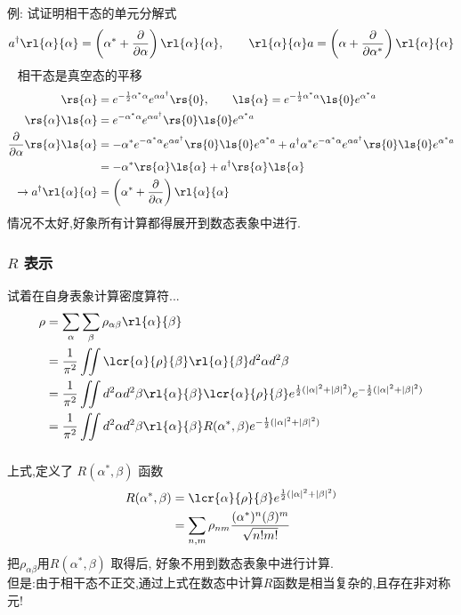 \begin{frame} 
\frametitle{}
  例: 试证明相干态的单元分解式
  \[ a^{\dagger} \rl{\alpha}{\alpha}= \left( \alpha^* + \frac{\partial }{\partial \alpha }\right) \rl{\alpha}{\alpha}, \qquad  \rl{\alpha}{\alpha} a = \left( \alpha + \frac{\partial }{\partial \alpha^* }\right) \rl{\alpha}{\alpha} \] 
  \证~ 相干态是真空态的平移
  \[ \begin{aligned}
    \rs{\alpha} &= e^{-\frac{1}{2} \alpha^* \alpha} e^{\alpha a^{\dagger}} \rs{0}, \qquad      \ls{\alpha} = e^{-\frac{1}{2} \alpha^* \alpha}  \ls{0} e^{\alpha^* a}\\
    \rs{\alpha}\ls{\alpha} &= e^{ - \alpha^* \alpha} e^{\alpha a^{\dagger}}\rs{0}\ls{0}e^{\alpha^* a}\\
    \frac{\partial }{\partial \alpha} \rs{\alpha}\ls{\alpha} &= - \alpha^* e^{ -\alpha^* \alpha} e^{\alpha a^{\dagger}}\rs{0}\ls{0}e^{\alpha^* a} + a^{\dagger} \alpha^*e^{ -\alpha^* \alpha} e^{\alpha a^{\dagger}}\rs{0}\ls{0}e^{\alpha^* a}\\
    &= - \alpha^* \rs{\alpha}\ls{\alpha} + a^{\dagger} \rs{\alpha}\ls{\alpha} \\ 
    \to a^{\dagger} \rl{\alpha}{\alpha} &= \left( \alpha^* + \frac{\partial }{\partial \alpha }\right) \rl{\alpha}{\alpha} 
  \end{aligned}\] 
  情况不太好,好象所有计算都得展开到数态表象中进行. 
\end{frame}

\begin{frame} 
  \frametitle{$R$ 表示}
  试着在自身表象计算密度算符...
  \[ \begin{aligned}
    \rho  &= \sum_\alpha\sum_\beta \rho_{\alpha \beta}\rl{\alpha}{\beta} \\
    &= \frac{1}{\pi^2} \iint \lcr{\alpha} {\rho} {\beta} \rl{\alpha}{\beta} d^2 \alpha d^2 \beta  \\
    &=\frac{1}{\pi^2} \iint d^2 \alpha d^2 \beta \rl{\alpha}{\beta} \lcr{\alpha} {\rho} {\beta} e^{\frac{1}{2}(\left|\alpha\right|^2+ \left| \beta\right|^2)}e^{-\frac{1}{2}(\left|\alpha\right|^2+ \left| \beta\right|^2)} \\ 
    &= \frac{1}{\pi^2} \iint d^2 \alpha d^2 \beta \rl{\alpha}{\beta} R(\alpha^*, \beta)e^{-\frac{1}{2}(\left|\alpha\right|^2+ \left| \beta\right|^2)} 
  \end{aligned}\]
  \end{frame}
  
  \begin{frame} 
      \frametitle{} 
  上式,定义了 $R(\alpha^*, \beta) $ 函数
  \[ \begin{aligned}
    R(\alpha^*, \beta) &= \lcr{\alpha} {\rho} {\beta} e^{\frac{1}{2}(\left|\alpha\right|^2+ \left| \beta\right|^2)} \\
    &= \sum_{n,m} \rho_{nm} \frac{(\alpha^*)^n (\beta)^m}{\sqrt{n! m!}}\\
  \end{aligned}\] 
  把$\rho_{\alpha\beta} $用$R(\alpha^*, \beta) $ 取得后, 好象不用到数态表象中进行计算. \\ 
  但是:由于相干态不正交,通过上式在数态中计算$R$函数是相当复杂的,且存在非对称元!
 \end{frame}

